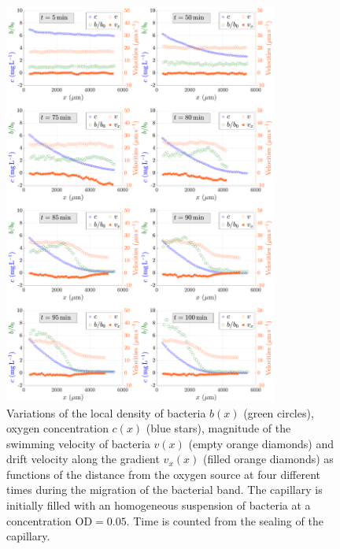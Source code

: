 \documentclass[aps,a4paper,twocolumn,10pt,pre,showpacs]{revtex4-2}
\begin{document}
\begin{figure}[ht]
\includegraphics[trim = 0mm 0mm 0mm 0mm, clip, width=0.8\textwidth, angle=0]{FigAE_01.pdf}
\caption{Variations of the local density of bacteria $b(x)$ (green circles), oxygen concentration $c(x)$ (blue stars), magnitude of the swimming velocity of bacteria $v(x)$ (empty orange diamonds) and drift velocity along the gradient $v_x(x)$ (filled orange diamonds) as functions of the distance from the oxygen source at four different times during the migration of the bacterial band. The capillary is initially filled with an homogeneous suspension of bacteria at a concentration $\text{OD}=0.05$. Time is counted from the sealing of the capillary.}   
\label{fig:SM_Compil_OD=0.05}
\end{figure}
\end{document}
